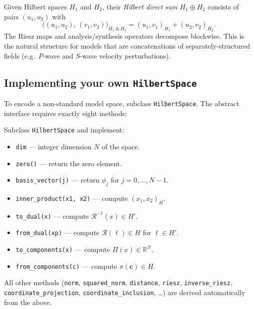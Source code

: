 \documentclass[11pt,twoside,openright]{book}
\theoremstyle{plain}
\theoremstyle{definition}
\theoremstyle{remark}
\newcommand{\Riesz}{\mathcal{R}}
\begin{document}
Given Hilbert spaces $H_1$ and $H_2$, their \emph{Hilbert direct sum}
$H_1 \oplus H_2$ consists of pairs $(u_1, u_2)$ with
\begin{equation}
  \label{eq:direct-sum-ip}
  \bigl((u_1, u_2),\, (v_1, v_2)\bigr)_{H_1 \oplus H_2}
  = (u_1, v_1)_{H_1} + (u_2, v_2)_{H_2}.
\end{equation}
The Riesz maps and analysis/synthesis operators decompose blockwise.
This is the natural structure for models that are concatenations of
separately-structured fields (e.g.\ $P$-wave and $S$-wave velocity
perturbations).

\subsection{Implementing your own \texttt{HilbertSpace}}
\label{ssec:custom-space}

To encode a non-standard model space, subclass \texttt{HilbertSpace}.
The abstract interface requires exactly eight methods:

\begin{codebox}
Subclass \texttt{HilbertSpace} and implement:
\begin{itemize}
  \item \texttt{dim} --- integer dimension $N$ of the space.
  \item \texttt{zero()} --- return the zero element.
  \item \texttt{basis\_vector(j)} --- return $\phi_j$ for $j = 0, \ldots, N-1$.
  \item \texttt{inner\_product(x1, x2)} --- compute $(x_1, x_2)_H$.
  \item \texttt{to\_dual(x)} --- compute $\Riesz^{-1}(x) \in H'$.
  \item \texttt{from\_dual(xp)} --- compute $\Riesz(\ell) \in H$ for $\ell \in H'$.
  \item \texttt{to\_components(x)} --- compute $\Pi(x) \in \mathbb{R}^N$.
  \item \texttt{from\_components(c)} --- compute $\pi(\mathbf{c}) \in H$.
\end{itemize}
All other methods (\texttt{norm}, \texttt{squared\_norm}, \texttt{distance},
\texttt{riesz}, \texttt{inverse\_riesz}, \texttt{coordinate\_projection},
\texttt{coordinate\_inclusion}, \ldots) are derived automatically from the above.
\end{codebox}
\end{document}
